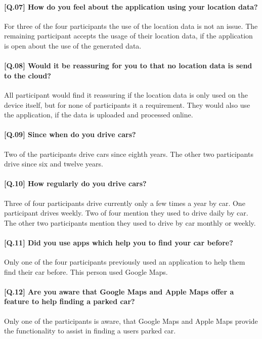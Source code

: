 \paragraph{[Q.07] How do you feel about the application using your location data?}
For three of the four participants the use of the location data is not an issue. The remaining participant accepts the usage of their location data, if the application is open about the use of the generated data. 

\paragraph{[Q.08] Would it be reassuring for you to that no location data is send to the cloud? }
All participant would find it reassuring if the location data is only used on the device itself, but for none of participants it a requirement. They would also use the application, if the data is uploaded and processed online. 

\paragraph{[Q.09] Since when do you drive cars?}
Two of the participants drive cars since eighth years. The other two participants drive since six and twelve years.

\paragraph{[Q.10] How regularly do you drive cars?}
Three of four participants drive currently only a few times a year by car. One participant drives weekly. Two of four mention they used to drive daily by car. The other two participants mention they used to drive by car monthly or weekly. 

\paragraph{[Q.11] Did you use apps which help you to find your car before?}
Only one of the four participants previously used an application to help them find their car before. This person used Google Maps.

\paragraph{[Q.12] Are you aware that Google Maps and Apple Maps offer a feature to help finding a parked car?}
Only one of the participants is aware, that Google Maps and Apple Maps provide the functionality to assist in finding a users parked car. 

